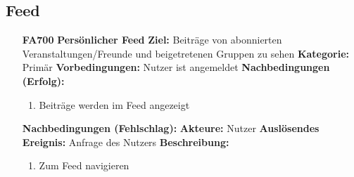 \documentclass[parskip=full]{scrartcl}
\begin{document}
		\subsection{\gls{Feed}} \label{sec:FAFeed}
		\begin{itemize}[nosep]
			
			\item[\textbf{FA700}]\textbf{Persönlicher \gls{Feed}}
			\newline \textbf{Ziel:} Beiträge von abonnierten Veranstaltungen/Freunde und beigetretenen Gruppen zu sehen
			\newline \textbf{Kategorie:} Primär
			\newline \textbf{Vorbedingungen:} Nutzer ist angemeldet
			\newline \textbf{Nachbedingungen (Erfolg):} 
			\begin{enumerate}[nosep]
				\item Beiträge werden im \gls{Feed} angezeigt 
			\end{enumerate}
			\textbf{Nachbedingungen (Fehlschlag):}
			\newline \textbf{Akteure:} Nutzer
			\newline \textbf{Auslösendes Ereignis:} Anfrage des Nutzers
			\newline \textbf{Beschreibung:}
			\begin{enumerate}[nosep]
				\item Zum \gls{Feed} navigieren\\
			\end{enumerate}
		\end{itemize}
		
		
		\newpage
\end{document}
